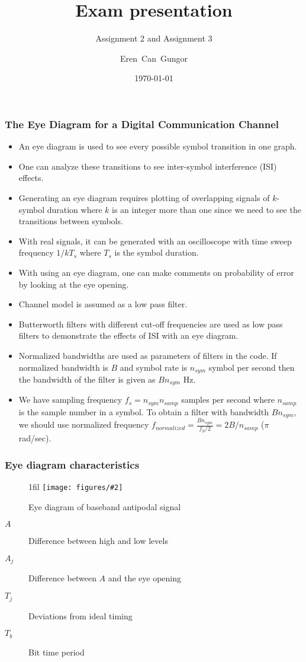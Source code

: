\documentclass{beamer}
\title{Exam presentation}
\subtitle{Assignment 2 and Assignment 3}
\author[Eren]{Eren~Can~Gungor\inst{1}}
\institute[DTU]
{
	\inst{1}
	Technical University of Denmark\\
	Digital Communication
}
\date{\today}
\makeatletter
\newcommand*{\centerfloat}{%
  \parindent \z@
  \leftskip \z@ \@plus 1fil \@minus \textwidth
  \rightskip\leftskip
  \parfillskip \z@skip}
\newcommand{\fig}[3]{
  \begin{figure}[H]
  \centerfloat
    \texttt{[image: figures/\#2]}
    \caption{#3}
  \end{figure}
}
\makeatother
\begin{document}
\frame{\titlepage}

\begin{frame}
	\frametitle {The Eye Diagram for a Digital Communication Channel}
\begin{itemize}
	\item An eye diagram is used to see every possible symbol transition in one graph.
	\item One can analyze these transitions to see inter-symbol interference (ISI) effects.
	\item Generating an eye diagram requires plotting of overlapping signals of $k$-symbol duration where $k$ is an integer more than one since we need to see the transitions between symbols.
	\item With real signals, it can be generated with an oscilloscope with time sweep frequency $1/kT_s$ where $T_s$ is the symbol duration.
	\item With using an eye diagram, one can make comments on probability of error by looking at the eye opening.

\end{itemize}
\end{frame}

\begin{frame}
\begin{itemize}
	\item Channel model is assumed as a low pass filter.
	\item Butterworth filters with different cut-off frequencies are used as low pass filters to demonstrate the effects of ISI with an eye diagram. 
	\item Normalized bandwidths are used as parameters of filters in the code. If normalized bandwidth is $B$ and symbol rate is $n_{sym}$ symbol per second then the bandwidth of the filter is given as $Bn_{sym}$ Hz.

	\item We have sampling frequency $f_s=n_{sym} n_{samp}$ samples per second where $n_{samp}$ is the sample number in a symbol. To obtain a filter with bandwidth $Bn_{sym}$, we should use normalized frequency $f_{normalized}=\frac{Bn_{sym}}{f_S/2}=2B/n_{samp}$ ($\pi$ rad/sec).
\end{itemize}
\end{frame}


\begin{frame}
	\frametitle{Eye diagram characteristics}
	\fig{3cm}{eye_diag_imp.png}{Eye diagram of baseband antipodal signal}
	\begin{description}
		\item[$A$] Difference between high and low levels
		\item[$A_j$] Difference between $A$ and the eye opening
		\item[$T_j$] Deviations from ideal timing
		\item[$T_b$] Bit time period
	\end{description}
\end{frame}
\end{document}
